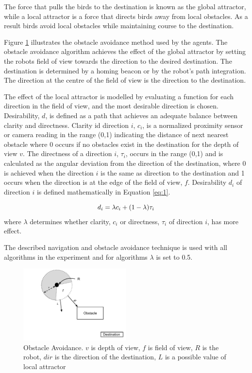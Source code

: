 The force that pulls the birds to the destination is known as the global attractor, while a local attractor is a force that directs birds away from local obstacles. As a result birds avoid local obstacles while maintaining course to the destination. 

Figure \ref{fig:obstacleavoidance} illustrates the obstacle avoidance method used by the agents. The obstacle avoidance algorithm achieves the effect of the global attractor by setting the robots field of view towards the direction to the desired destination. The destination is determined by a homing beacon or by the robot's path integration. The direction at the centre of the field of view is the direction to the destination. 

The effect of the local attractor is modelled by evaluating a function for each direction in the field of view, and the most desirable direction is chosen. Desirability, $d$, is defined as a path that achieves an adequate balance between clarity and directness. Clarity id direction $i$, $c_i$, is a normalized proximity sensor or camera reading in the range (0,1) indicating the distance of next nearest obstacle where 0 occurs if no obstacles exist in the destination for the depth of view $v$. The directness of a direction $i$, $\tau_i$, occurs in the range (0,1) and is calculated as the angular deviation from the direction of the destination, where 0 is achieved when the direction $i$ is the same as direction to the destination and 1 occurs when the direction is at the edge of the field of view, $f$. Desirability $d_i$ of direction $i$ is defined mathematically in Equation \ref{eq:1}.

\begin{equation}
	d_i= \lambda c_i + (1 - \lambda)\tau_i \\
	\label{eq:1}
\end{equation} where $\lambda$ determines whether clarity, $c_i$ or directness, $\tau_i$ of direction $i$, has more effect.
 
The described navigation and obstacle avoidance technique is used with all algorithms in the experiment and for algorithms $\lambda$ is set to 0.5.

\begin{figure}
	\centering
	\includegraphics[width=0.5\textwidth]{chapters/chapter3/figures/ObstacleAvoidance.pdf}
	\caption{Obstacle Avoidance. $v$ is depth of view, $f$ is field of view, $R$ is the robot, $dir$ is the direction of the destination, $L$ is a possible value of local attractor}
	\label{fig:obstacleavoidance}
\end{figure}



